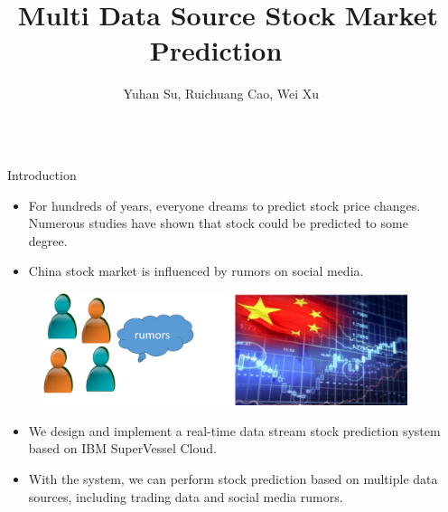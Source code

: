 \documentclass[final,hyperref={pdfpagelabels=false}]{beamer}
\title{\huge  ~\vspace{10mm} \newline  Multi Data Source Stock Market Prediction}
\author{\huge~\vspace{10mm} \newline  Yuhan Su, Ruichuang Cao, Wei Xu} %
\institute{\huge Tsinghua University} %
\begin{document}
\linespread{0.98}	

\begin{frame}[t] %

\begin{columns}[t] %

\begin{column}{.03\textwidth}\end{column} %

\begin{column}{.445\textwidth} %


\begin{block}{Introduction}
\begin{itemize}	
\item For hundreds of years, everyone dreams to predict stock price changes. Numerous studies have shown that stock could be predicted to some degree. 
\item China stock market is influenced by rumors on social media.
\end{itemize}
\centering
\begin{figure}
	\includegraphics[width=0.6\linewidth]{intro.png}
	\label{intro}
\end{figure}
\begin{itemize}
 \item We design and implement a real-time data stream stock prediction system based on IBM SuperVessel Cloud.  
\item With the system, we can perform stock prediction based on multiple data sources, including trading data and social media rumors. 


\end{itemize}
\end{block}
\end{column}
\end{columns}
\end{frame}
\end{document}
